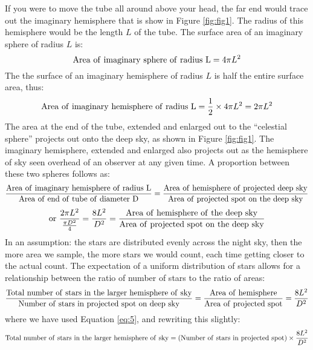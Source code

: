 \documentclass{article}
\begin{document}
If you were to move the tube all around above your head, the far end would trace out the imaginary hemisphere that is show in Figure \ref{fig:fig1}. The radius of this hemisphere would be the length $L$ of the tube. The surface area of an imaginary sphere of radius $L$ is:
\begin{equation}
{\rm Area~of~imaginary~sphere~of~radius~L}= 4\pi L^2
\end{equation}
The the surface of an imaginary hemisphere of radius $L$ is half the entire surface area, thus:
\begin{equation}
{\rm Area~of~imaginary~hemisphere~of~radius~L}= \frac{1}{2} \times 4\pi L^2 = 2\pi L^2
\end{equation}
The area at the end of the tube, extended and enlarged out to the ``celestial sphere'' projects out onto the deep sky, as shown in Figure \ref{fig:fig1}. The imaginary hemisphere, extended and enlarged also projects out as the hemisphere of sky seen overhead of an observer at any given time. A proportion between these two spheres follows as:
\begin{equation}
 \frac{\rm Area~of~imaginary~hemisphere~of~radius~L}{\rm Area~of~end~of~tube~of~diameter~D} = \frac{\rm Area~of~hemisphere~of~projected~deep~sky}{\rm Area~of~projected~spot~on~the~deep~sky} 
\end{equation}
\begin{equation}
{\rm or~} \frac{2 \pi L^2}{\frac{\pi D^2}{4}}=\frac{8L^2}{D^2}  = \frac{\rm Area~of~hemisphere~of~the~deep~sky}{\rm Area~of~projected~spot~on~the~deep~sky} \label{eq:5}
\end{equation}
In an assumption: the stars are distributed evenly across the night sky, then the more area we sample, the more stars we would count, each time getting closer to the actual count. The expectation of a uniform distribution of stars allows for a relationship between the ratio of number of stars to the ratio of areas:
\begin{equation}
\frac{\rm Total~number~of~stars~in~the~larger~hemisphere~of~sky}{\rm Number~of~stars~in~projected~spot~on~deep~sky} = \frac{\rm Area~of~hemisphere}{\rm Area~of~projected~spot}=\frac{8L^2}{D^2}
\end{equation}
where we have used Equation \ref{eq:5}, and rewriting this slightly:
\begin{equation}
{\rm Total~number~of~stars~in~the~larger~hemisphere~of~sky} = ({\rm Number~of~stars~in~projected~spot}) \times \frac{8L^2}{D^2}
\end{equation}
\end{document}
